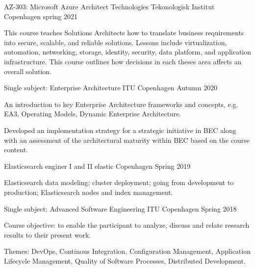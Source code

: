 


\begin{cventries}

\cventry
{AZ-303: Microsoft Azure Architect Technologies}
{Tekonologisk Institut}
{Copenhagen}
{spring 2021}
{\begin{cvitems}
\item This course teaches Solutions Architects how to translate business requirements into secure, scalable, and reliable solutions. Lessons include virtualization, automation, networking, storage, identity, security, data platform, and application infrastructure. This course outlines how decisions in each theses area affects an overall solution.
\end{cvitems}}

\cventry
{Single subject: Enterprise Architecture}
{ITU}
{Copenhagen}
{Autumn 2020}
{\begin{cvitems}
\item An introduction to key Enterprise Architecture frameworks and concepts, e.g. EA3, Operating Models, Dynamic Enterprise Architecture.
\item Developed an implementation strategy for a strategic initiative in BEC along with an assessment of the architectural maturity within BEC based on the course content.
\end{cvitems}}

\cventry
{Elasticsearch enginer I and II}
{elastic}
{Copenhagen}
{Spring 2019}
{\begin{cvitems}
\item Elasticsearch data modeling; cluster deployment; going from development to production; Elasticsearch nodes and index management.
\end{cvitems}}

\cventry
{Single subject: Advanced Software Engineering}
{ITU}
{Copenhagen}
{Spring 2018}
{\begin{cvitems}
\item Course objective: to enable the participant to analyze, discuss and relate research results to their present work.
\item Themes:
DevOps, Continous Integration, Configuration Management, Application Lifecycle Management, Quality of Software Processes, Distributed Development.
\end{cvitems}}


\end{cventries}
